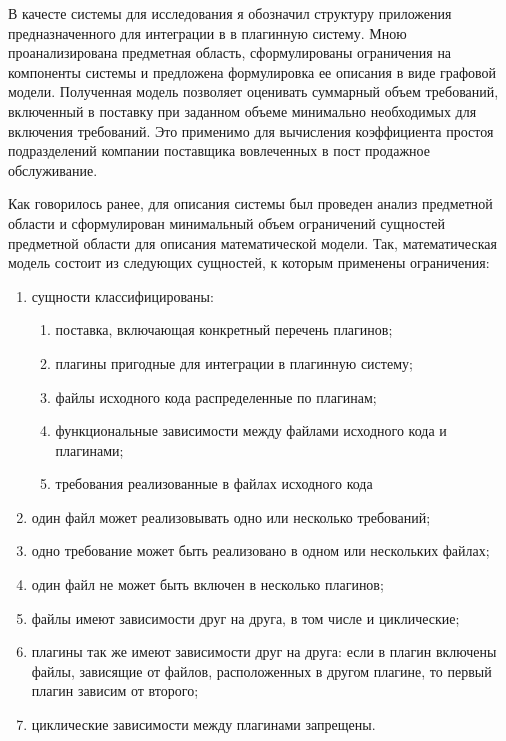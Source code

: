 
В качесте системы для исследования я обозначил структуру приложения предназначенного для интеграции в в плагинную систему. Мною проанализирована предметная область, сформулированы ограничения на компоненты системы и предложена формулировка ее описания в виде графовой модели. Полученная модель позволяет оценивать суммарный объем требований, включенный в поставку при заданном объеме минимально необходимых для включения требований. Это применимо для вычисления коэффициента простоя подразделений компании поставщика вовлеченных в пост продажное обслуживание.

Как говорилось ранее, для описания системы был проведен анализ предметной области и сформулирован минимальный объем ограничений сущностей предметной области для описания математической модели. Так, математическая модель состоит из следующих сущностей, к которым применены ограничения:
\begin{enumerate}
    \item сущности классифицированы:
    \begin{enumerate}
        \item поставка, включающая конкретный перечень плагинов;
        \item плагины пригодные для интеграции в плагинную систему;
        \item файлы исходного кода распределенные по плагинам;
        \item функциональные зависимости между файлами исходного кода и плагинами;
        \item требования реализованные в файлах исходного кода
    \end{enumerate}
    \item один файл может реализовывать одно или несколько требований;
    \item одно требование может быть реализовано в одном или нескольких файлах;
    \item один файл не может быть включен в несколько плагинов;
    \item файлы имеют зависимости друг на друга, в том числе и циклические;
    \item плагины так же имеют зависимости друг на друга: если в плагин включены файлы, зависящие от файлов, расположенных в другом плагине, то первый плагин зависим от второго;
    \item циклические зависимости между плагинами запрещены.
\end{enumerate}

